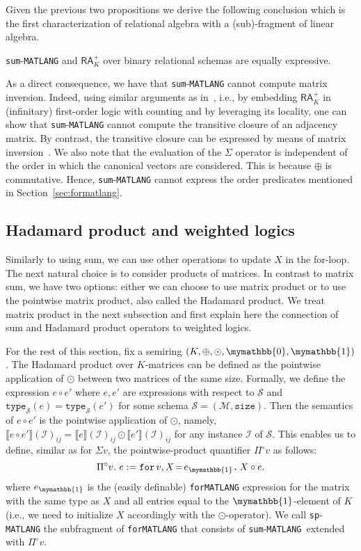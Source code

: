 \documentclass[sigconf]{acmart}
\newcommand{\cS}{\mathcal{S}}
\newcommand{\sem}[2]{\llbracket #1 \rrbracket(#2)}
\newcommand{\Mnam}{\mathcal{M}}
\newcommand{\I}{\mathcal{I}}
\newcommand{\Sch}{\mathcal{S}}
\newcommand{\size}{\texttt{size}}
\newcommand{\ttype}{\texttt{type}_{\Sch}}
\newcommand{\langfor}{\texttt{for}\text{-}\texttt{MATLANG}\xspace}
\newcommand{\langsum}{\texttt{sum}-\texttt{MATLANG}\xspace}
\newcommand{\langprod}{\texttt{sp}-\texttt{MATLANG}\xspace}
\newcommand{\ffor}[3]{\texttt{for}\, #1,#2 \texttt{.}\, #3}
\newcommand{\ksum}{\oplus}
\newcommand{\kprod}{\odot}
\newcommand{\kzero}{\mymathbb{0}}
\newcommand{\kone}{\mymathbb{1}}
\newcommand{\hadprod}{\circ}
\newcommand{\qhadprod}{\Pi^{\hadprod}}
\begin{document}
Given the previous two propositions we derive the following conclusion which is the first characterization of relational algebra with a (sub)-fragment of linear algebra.
\begin{corollary}
	\langsum and $\mathsf{RA}_{K}^+$  over binary relational schemas are equally expressive. 
\end{corollary}

As a direct consequence, we have that \langsum cannot compute matrix inversion. Indeed, using similar arguments as
in~\cite{matlang-journal}, i.e., by embedding $\mathsf{RA}_{K}^+$  in (infinitary) first-order logic with counting and by leveraging its locality, one can show that \langsum cannot compute the transitive closure of an adjacency matrix. By contrast, the transitive closure can be expressed by means of matrix inversion~\cite{matlang-journal}. We also note that the evaluation of the $\Sigma$ operator is
independent of the order in which the canonical vectors are considered. This is because $\oplus$ is commutative.
Hence, \langsum cannot express the order predicates mentioned in Section~\ref{sec:formatlang}.



\subsection{Hadamard product and weighted logics}\label{subsec:langprod}
Similarly to using sum, we can use other operations to update $X$ in the for-loop. The next natural choice is to consider products of matrices. In contrast to matrix sum, we have two options: either we can choose to use matrix product or to use the pointwise matrix product, also called the Hadamard product. We treat  matrix product in the next subsection and first explain here the connection of sum and Hadamard product operators to weighted logics.

For the rest of this section, fix a semiring $(K, \ksum, \kprod, \kzero, \kone)$. The Hadamard product over $K$-matrices can be defined as the pointwise application of $\kprod$ between two matrices of the same size. Formally, we define the expression $e \hadprod e'$ where $e, e'$ are expressions with respect to $\cS$ and $\ttype(e) = \ttype(e')$ for some schema $\Sch=(\Mnam,\size)$. Then the semantics of $e \hadprod e'$ is the pointwise application of $\kprod$, namely, $\sem{e \hadprod e'}{\I}_{ij} = \sem{e}{\I}_{ij} \kprod \sem{e'}{\I}_{ij}$ for any instance $\I$ of $\cS$. This enables us to define, similar as for  $\Sigma v$, the  pointwise-product quantifier $\qhadprod v$ as follows:
$$
\qhadprod v. \  e := \ffor{v}{X\!=\!e_{\kone}}{X \circ e}.
$$
where $e_\kone$ is the (easily definable) \langfor expression for the matrix with the same type as $X$ and all entries equal to the $\kone$-element of $K$ (i.e., we need to initialize $X$ accordingly with the $\kprod$-operator).
We call \langprod  the subfragment of \langfor that consists of \langsum \ extended with $\qhadprod v$.
\end{document}
